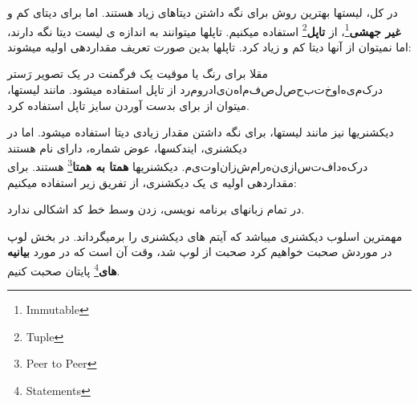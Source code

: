 \documentclass[14pt,a4paper]{memoir}
\begin{document}
 	 	\begin{latin}
	
\end{latin}

 	 
	 در کل، لیستها بهترین روش برای نگه داشتن دیتاهای زیاد هستند. اما برای دیتای کم و \textbf{غیر جهشی}\footnote{Immutable}، از \textbf{تاپل}\footnote{Tuple} استفاده میکنیم.  تاپلها میتوانند به اندازه ی لیست دیتا نگه دارند، اما نمیتوان از آنها دیتا کم و زیاد کرد. تاپلها بدین صورت تعریف مقداردهی اولیه میشوند:
	 
	 
 	 	\begin{latin}
	
\end{latin}
	 مقلا برای رنگ یا موقیت یک فرگمنت در یک تصویر رَستر \(در مورد اینها مفصل صحبت خواهیم کرد\) از تاپل استفاده میشود. مانند لیستها، میتوان از  برای بدست آوردن سایز تاپل استفاده کرد.
	 
	 دیکشنریها نیز مانند لیستها، برای نگه داشتن مقدار زیادی دیتا استفاده میشود. اما در دیکشنری، ایندکسها، عوض شماره، دارای نام هستند \(میتوان از شماره نیز استفاده کرد\). دیکشنریها \textbf{همتا به همتا}\footnote{Peer to Peer} هستند. برای مقداردهی اولیه ی یک دیکشنری، از تفریق زیر استفاده میکنیم:
	 
	 \begin{latin}
	 	
	 \end{latin}
	 
	 \begin{tip}
	 	در تمام زبانهای برنامه نویسی، زدن \keys{\return}  وسط خط کد اشکالی ندارد.
	 \end{tip}
	 
	 
	 مهمترین اسلوب دیکشنری  میباشد که آیتم های دیکشنری را برمیگرداند. در بخش لوپ در موردش صحبت خواهیم کرد صحبت از لوپ شد، وقت آن است که در مورد \textbf{بیانیه های}\footnote{Statements} پایتان صحبت کنیم.
	 
\end{document}
